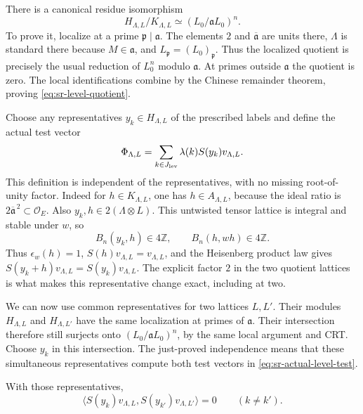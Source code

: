 There is a canonical residue isomorphism
\begin{equation}\label{eq:sr-level-quotient}
 H_{\Lambda,L}/K_{\Lambda,L}
              \simeq (L_0/\mathfrak aL_0)^n.
\end{equation}
To prove it, localize at a prime \(\mathfrak p\mid\mathfrak a\).
The elements \(2\) and
\(\overline{\mathfrak a}\) are units there,
\(\Lambda\) is standard there because \(M\in\mathfrak a\),
and \(L_{\mathfrak p}=(L_0)_{\mathfrak p}\).
Thus the localized quotient is precisely the usual reduction
of \(L_0^n\) modulo \(\mathfrak a\).
At primes outside \(\mathfrak a\) the quotient is zero.
The local identifications combine by the Chinese remainder
theorem, proving \eqref{eq:sr-level-quotient}.

Choose any representatives \(y_k\in H_{\Lambda,L}\) of the
prescribed labels and define the actual test vector
\begin{equation}\label{eq:sr-actual-level-test}
 \Phi_{\Lambda,L}
    =\sum_{k\in J_{\rm lev}}\lambda(k)S(y_k)v_{\Lambda,L}.
\end{equation}
This definition is independent of the representatives, with no
missing root-of-unity factor.
Indeed for \(h\in K_{\Lambda,L}\), one has
\(h\in A_{\Lambda,L}\), because the ideal ratio is
\(2\overline{\mathfrak a}^{\,2}\subset\mathcal O_E\).
Also \(y_k,h\in2(\Lambda\otimes L)\).
This untwisted tensor lattice is integral and stable under \(w\),
so
\[
 B_n(y_k,h)\in4\mathbb Z,\qquad
 B_n(h,wh)\in4\mathbb Z .
\]
Thus \(\epsilon_w(h)=1\), \(S(h)v_{\Lambda,L}=v_{\Lambda,L}\),
and the Heisenberg product law gives
\(S(y_k+h)v_{\Lambda,L}=S(y_k)v_{\Lambda,L}\).
The explicit factor \(2\) in the two quotient lattices is what
makes this representative change exact, including at two.

We can now use common representatives for two lattices \(L,L'\).
Their modules \(H_{\Lambda,L}\) and \(H_{\Lambda,L'}\) have the
same localization at primes of \(\mathfrak a\).
Their intersection therefore still surjects onto
\((L_0/\mathfrak aL_0)^n\), by the same local argument and CRT.
Choose \(y_k\) in this intersection.
The just-proved independence means that these simultaneous
representatives compute both test vectors in
\eqref{eq:sr-actual-level-test}.

\begin{srproposition}
\label{prop:sr-level-label-orthogonality}
With those representatives,
\[
 \langle S(y_k)v_{\Lambda,L},
              S(y_{k'})v_{\Lambda,L'}\rangle=0
                      \qquad(k\ne k').
\]
\end{srproposition}


